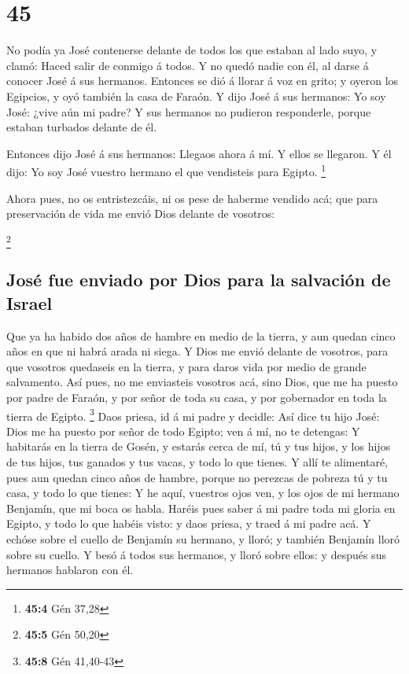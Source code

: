 \hypertarget{section-44}{%
\section{45}\label{section-44}}

 No podía ya José contenerse delante de todos los que
estaban al lado suyo, y clamó: Haced salir de conmigo á todos. Y no
quedó nadie con él, al darse á conocer José á sus hermanos.
 Entonces se dió á llorar á voz en grito; y oyeron los
Egipcios, y oyó también la casa de Faraón.  Y dijo José á
sus hermanos: Yo soy José: ¿vive aún mi padre? Y sus hermanos no
pudieron responderle, porque estaban turbados delante de él.

 Entonces dijo José á sus hermanos: Llegaos ahora á mí. Y
ellos se llegaron. Y él dijo: Yo soy José vuestro hermano el que
vendisteis para Egipto. \footnote{\textbf{45:4} Gén 37,28}

 Ahora pues, no os entristezcáis, ni os pese de haberme
vendido acá; que para preservación de vida me envió Dios delante de
vosotros:

\footnote{\textbf{45:5} Gén 50,20}

\hypertarget{josuxe9-fue-enviado-por-dios-para-la-salvaciuxf3n-de-israel}{%
\subsection{José fue enviado por Dios para la salvación de
Israel}\label{josuxe9-fue-enviado-por-dios-para-la-salvaciuxf3n-de-israel}}

 Que ya ha habido dos años de hambre en medio de la
tierra, y aun quedan cinco años en que ni habrá arada ni siega.
 Y Dios me envió delante de vosotros, para que vosotros
quedaseis en la tierra, y para daros vida por medio de grande
salvamento.  Así pues, no me enviasteis vosotros acá, sino
Dios, que me ha puesto por padre de Faraón, y por señor de toda su casa,
y por gobernador en toda la tierra de Egipto. \footnote{\textbf{45:8}
  Gén 41,40-43}  Daos priesa, id á mi padre y decidle: Así
dice tu hijo José: Dios me ha puesto por señor de todo Egipto; ven á mí,
no te detengas:  Y habitarás en la tierra de Gosén, y
estarás cerca de mí, tú y tus hijos, y los hijos de tus hijos, tus
ganados y tus vacas, y todo lo que tienes.  Y allí te
alimentaré, pues aun quedan cinco años de hambre, porque no perezcas de
pobreza tú y tu casa, y todo lo que tienes:  Y he aquí,
vuestros ojos ven, y los ojos de mi hermano Benjamín, que mi boca os
habla.  Haréis pues saber á mi padre toda mi gloria en
Egipto, y todo lo que habéis visto: y daos priesa, y traed á mi padre
acá.  Y echóse sobre el cuello de Benjamín su hermano, y
lloró; y también Benjamín lloró sobre su cuello.  Y besó
á todos sus hermanos, y lloró sobre ellos: y después sus hermanos
hablaron con él.

